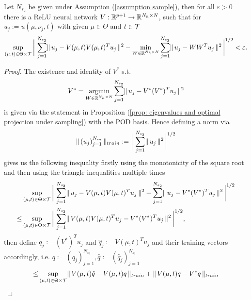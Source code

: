 \begin{lemma} \label{lemma: optimal projection error}
    Let $N_{s_2}$ be given under Assumption (\ref{assumption sample}), then for all $\varepsilon > 0$ there is a ReLU neural network
    $V: \mathbb{R}^{p+1} \to \mathbb{R}^{N_h \times N}$, such that for $u_j := u(\mu, \nu_j, t)$ with given $\mu \in \Theta$ and $t \in \mathcal{T}$
    \begin{equation*}
        \sup\limits_{(\mu, t) \in \Theta \times \mathcal{T}} \bigg\vert \, \sum_{j=1}^{N_{s_2}} \lVert \, u_j - V(\mu, t) V(\mu, t)^T u_j \, \rVert^2 \\
        - \min\limits_{W \in \mathbb{R}^{N_h \times N}} \sum_{j = 1}^{N_{s_2}} \lVert \, u_j - W W^T u_j \, \rVert^2 \, \bigg\vert^{1/2} < \varepsilon.
    \end{equation*}
\end{lemma}
\begin{proof}
    The existence and identity of $V^*$ s.t. 
    \begin{equation*}
        V^* = \underset{W \in \mathbb{R}^{N_h \times N}}{\operatorname{argmin}} \sum_{j=1}^{N_{s_2}}
        \lVert \, u_j - V^* (V^*)^T u_j \, \rVert^2    
    \end{equation*}
    is given via the statement in Proposition (\ref{prop: eigenvalues and optimal projection under sampling}) with the POD basis.
    Hence defining a norm via 
    \begin{equation*}
        \lVert \, (u_j)_{j=1}^{N_{s_2}} \, \rVert_{train} := \bigg\vert \, \sum_{j=1}^{N_{s_2}} \lVert \, u_j \, \rVert^2 \, \bigg\vert^{1/2}
    \end{equation*}
    gives us the following inequality firstly using the monotonicity of the square root and then using the triangle inequalities multiple times
    \begin{align*}
        &\sup\limits_{(\mu, t) \in \Theta \times \mathcal{T}} \bigg\vert \, \sum_{j=1}^{N_{s_2}} \lVert \, u_j - V(\mu, t) V(\mu, t)^T u_j \, \rVert^2 
        - \sum_{j = 1}^{N_{s_2}} \lVert \, u_j - V^* (V^*)^T u_j \, \rVert^2 \, \bigg\vert^{1/2} \\
        \leq &\sup\limits_{(\mu, t) \in \Theta \times \mathcal{T}} \bigg\vert \, \sum_{j = 1}^{N_{s_2}} \lVert \, V(\mu, t) V(\mu, t)^T u_j - V^* (V^*)^T u_j \, \rVert^2 \, \bigg\vert^{1/2}, 
    \end{align*}
    then define $q_j := (V^*)^T u_j$ and $\hat{q}_j := V(\mu, t)^T u_j$ and their training vectors accordingly, i.e. $q := (q_j)_{j=1}^{N_{s_2}}, \hat{q} := (\hat{q}_j)_{j=1}^{N_{s_2}}$
    \begin{align*}
        \leq &\sup\limits_{(\mu, t) \in \Theta \times \Tcal} \norm{V(\mu, t) \hat{q} - V(\mu, t) q}_{train} + \norm{V(\mu, t) q - V^* q}_{train} \\

\end{align*}
\end{proof}
